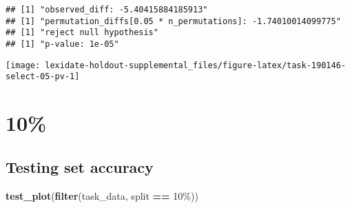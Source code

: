 \documentclass[
]{book}
\newenvironment{Shaded}{\begin{snugshade}}{\end{snugshade}}
\newcommand{\AttributeTok}[1]{\textcolor[rgb]{0.13,0.29,0.53}{#1}}
\newcommand{\DecValTok}[1]{\textcolor[rgb]{0.00,0.00,0.81}{#1}}
\newcommand{\FunctionTok}[1]{\textcolor[rgb]{0.13,0.29,0.53}{\textbf{#1}}}
\newcommand{\NormalTok}[1]{#1}
\newcommand{\OtherTok}[1]{\textcolor[rgb]{0.56,0.35,0.01}{#1}}
\newcommand{\SpecialCharTok}[1]{\textcolor[rgb]{0.81,0.36,0.00}{\textbf{#1}}}
\newcommand{\StringTok}[1]{\textcolor[rgb]{0.31,0.60,0.02}{#1}}
\begin{document}
\begin{Shaded}
\end{Shaded}

\begin{verbatim}
## [1] "observed_diff: -5.40415884185913"
## [1] "permutation_diffs[0.05 * n_permutations]: -1.74010014099775"
## [1] "reject null hypothesis"
## [1] "p-value: 1e-05"
\end{verbatim}

\texttt{[image: lexidate-holdout-supplemental\_files/figure-latex/task-190146-select-05-pv-1]}

\hypertarget{section-16}{%
\section{10\%}\label{section-16}}

\hypertarget{testing-set-accuracy-16}{%
\subsection{Testing set accuracy}\label{testing-set-accuracy-16}}

\begin{Shaded}
\begin{Highlighting}[]
\FunctionTok{test\_plot}\NormalTok{(}\FunctionTok{filter}\NormalTok{(task\_data, split }\SpecialCharTok{==} \StringTok{\textquotesingle{}10\%\textquotesingle{}}\NormalTok{))}
\end{Highlighting}
\end{Shaded}
\end{document}
